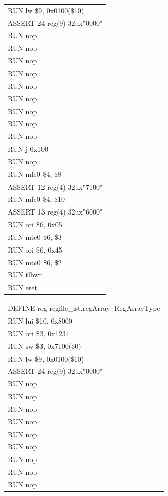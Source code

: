 \documentclass[11pt,utf8]{article}
\begin{document}
{{{{\begin{center}
\begin{longtable}{p{15cm}}
		RUN{ }lw{ }{ }\$9,{ }0x0100(\$10)\\
		ASSERT{ }24{ }reg(9){ }32ux"0000"\\
		RUN{ }nop\\
		RUN{ }nop\\
		RUN{ }nop\\
		RUN{ }nop\\
		RUN{ }nop\\
		RUN{ }nop\\
		RUN{ }nop\\
		RUN{ }nop\\
		RUN{ }nop\\
		RUN{ }j{ }0x100\\
		RUN{ }nop\\
		RUN{ }mfc0{ }\$4,{ }\$8\\
		ASSERT{ }12{ }reg(4){ }32ux"7100"\\
		RUN{ }mfc0{ }\$4,{ }\$10\\
		ASSERT{ }13{ }reg(4){ }32ux"6000"\\
		RUN{ }ori{ }\$6,{ }0x05\\
		RUN{ }mtc0{ }\$6,{ }\$3\\
		RUN{ }ori{ }\$6,{ }0x45\\
		RUN{ }mtc0{ }\$6,{ }\$2\\
		RUN{ }tlbwr\\
		RUN{ }eret\\
		\hline \end{longtable} \end{center}
\begin{center}	\begin{longtable}{p{15cm}} \hline
		DEFINE{ }reg{ }regfile\_ist.regArray:{ }RegArrayType\\
		RUN{ }lui{ }\$10,{ }0x8000\\
		RUN{ }ori{ }\$3,{ }0x1234\\
		RUN{ }sw{ }{ }\$3,{ }0x7100(\$0)\\
		RUN{ }lw{ }{ }\$9,{ }0x0100(\$10)\\
		ASSERT{ }24{ }reg(9){ }32ux"0000"\\
		RUN{ }nop\\
		RUN{ }nop\\
		RUN{ }nop\\
		RUN{ }nop\\
		RUN{ }nop\\
		RUN{ }nop\\
		RUN{ }nop\\
		RUN{ }nop\\
		RUN{ }nop\\

\end{longtable}
\end{center}}}}}
\end{document}
